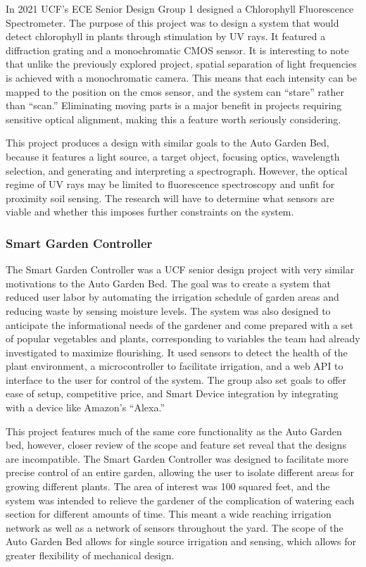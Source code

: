 In 2021 UCF’s ECE Senior Design Group 1 designed a Chlorophyll Fluorescence Spectrometer. The purpose of this project was to design a system that would detect chlorophyll in plants through stimulation by UV rays. It featured a diffraction grating and a monochromatic CMOS sensor. It is interesting to note that unlike the previously explored project, spatial separation of light frequencies is achieved with a monochromatic camera. This means that each intensity can be mapped to the position on the cmos sensor, and the system can “stare” rather than “scan.” Eliminating moving parts is a major benefit in projects requiring sensitive optical alignment, making this a feature worth seriously considering.

This project produces a design with similar goals to the Auto Garden Bed, because it features a light source, a target object, focusing optics, wavelength selection, and generating and interpreting a spectrograph. However, the optical regime of UV rays may be limited to fluorescence spectroscopy and unfit for proximity soil sensing. The research will have to determine what sensors are viable and whether this imposes further constraints on the system.

\subsubsection{Smart Garden Controller}

The Smart Garden Controller was a UCF senior design project with very similar motivations to the Auto Garden Bed. The goal was to create a system that reduced user labor by automating the irrigation schedule of garden areas and reducing waste by sensing moisture levels. The system was also designed to anticipate the informational needs of the gardener and come prepared with a set of popular vegetables and plants, corresponding to variables the team had already investigated to maximize flourishing. It used sensors to detect the health of the plant environment, a microcontroller to facilitate irrigation, and a web API to interface to the user for control of the system. The group also set goals to offer ease of setup, competitive price, and Smart Device integration by integrating with a device like Amazon’s “Alexa.”

This project features much of the same core functionality as the Auto Garden bed, however, closer review of the scope and feature set reveal that the designs are incompatible. The Smart Garden Controller was designed to facilitate more precise control of an entire garden, allowing the user to isolate different areas for growing different plants. The area of interest was 100 squared feet, and the system was intended to relieve the gardener of the complication of watering each section for different amounts of time. This meant a wide reaching irrigation network as well as a network of sensors throughout the yard. The scope of the Auto Garden Bed allows for single source irrigation and sensing, which allows for greater flexibility of mechanical design.

